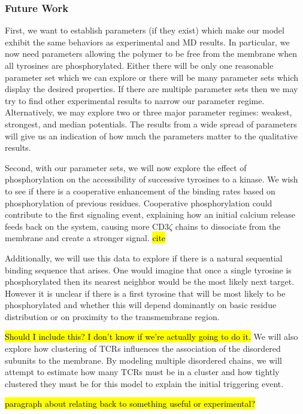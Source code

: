 \documentclass[../../AdvancementSummary.tex]{subfiles}
\begin{document}
{\subsubsection{Future Work}

First, we want to establish parameters (if they exist) which make our model exhibit the same behaviors as experimental and MD results. In particular, we now need parameters allowing the polymer to be free from the membrane when all tyrosines are phosphorylated. Either there will be only one reasonable parameter set which we can explore or there will be many parameter sets which display the desired properties.  If there are multiple parameter sets then we may try to find other experimental results to narrow our parameter regime. Alternatively, we may explore two or three major parameter regimes: weakest, strongest, and median potentials. The results from a wide spread of parameters will give us an indication of how much the parameters matter to the qualitative results.  

Second, with our parameter sets, we will now explore the effect of phosphorylation on the accessibility of successive tyrosines to a kinase.  We wish to see if there is a cooperative enhancement of the binding rates based on phosphorylation of previous residues.  Cooperative phosphorylation could contribute to the first signaling event, explaining how an initial calcium release feeds back on the system, causing more CD3$\zeta$ chains to dissociate from the membrane and create a stronger signal. \hl{cite}

Additionally, we will use this data to explore if there is a natural sequential binding sequence that arises.  One would imagine that once a single tyrosine is phosphorylated then its nearest neighbor would be the most likely next target.  However it is unclear if there is a first tyrosine that will be most likely to be phosphorylated and whether this will depend dominantly on basic residue distribution or on proximity to the transmembrane region. 

\hl{Should I include this?  I don't know if we're actually going to do it.}
We will also explore how clustering of TCRs influences the association of the disordered subunits to the membrane. By modeling multiple disordered chains, we will attempt to estimate how many TCRs must be in a cluster and how tightly clustered they must be for this model to explain the initial triggering event.

\hl{paragraph about relating back to something useful or experimental?}

}
\end{document}
